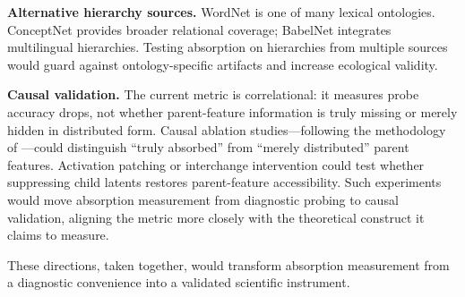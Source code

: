 \documentclass{article}
\begin{document}
\textbf{Alternative hierarchy sources.} WordNet is one of many lexical ontologies. ConceptNet \citep{speer2017conceptnet} provides broader relational coverage; BabelNet \citep{navigli2012babelnet} integrates multilingual hierarchies. Testing absorption on hierarchies from multiple sources would guard against ontology-specific artifacts and increase ecological validity.

\textbf{Causal validation.} The current metric is correlational: it measures probe accuracy drops, not whether parent-feature information is truly missing or merely hidden in distributed form. Causal ablation studies---following the methodology of \citet{chanin2024feature}---could distinguish ``truly absorbed'' from ``merely distributed'' parent features. Activation patching or interchange intervention \citep{geiger2023causal} could test whether suppressing child latents restores parent-feature accessibility. Such experiments would move absorption measurement from diagnostic probing to causal validation, aligning the metric more closely with the theoretical construct it claims to measure.

These directions, taken together, would transform absorption measurement from a diagnostic convenience into a validated scientific instrument.



\end{document}
